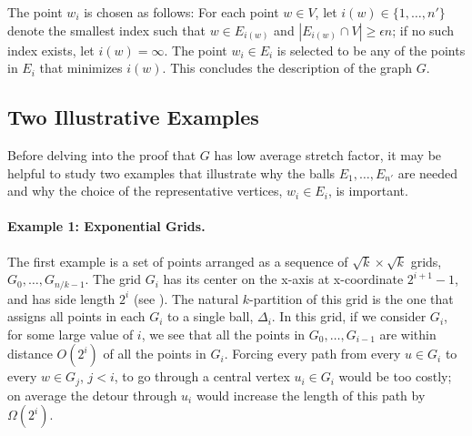 \documentclass{patmorin}
\begin{document}
The point $w_i$ is chosen as follows: For each point $w\in V$, let
$i(w)\in \{1,\ldots,n'\}$ denote the smallest index such that $w\in
E_{i(w)}$ and $|E_{i(w)}\cap V| \ge \epsilon n$; if no such index exists,
let $i(w)=\infty$.  The point $w_i\in E_i$ is selected to be any of the
points in $E_i$ that minimizes $i(w)$.  This concludes the description
of the graph $G$.


\subsection{Two Illustrative Examples}
Before delving into the proof that $G$ has low average stretch factor,
it may be helpful to study two examples that illustrate why the balls
$E_1,\ldots,E_{n'}$ are needed and why the choice of the representative
vertices, $w_i\in E_i$, is  important.

\paragraph{Example 1: Exponential Grids.}
The first example is a set of points arranged as a sequence of
$\sqrt{k}\times\sqrt{k}$ grids, $G_0,\ldots,G_{n/k-1}$.  The grid $G_i$
has its center on the x-axis at x-coordinate $2^{i+1}-1$, and has side
length $2^i$ (see ). The natural $k$-partition of this
grid is the one that assigns all points in each $G_i$ to a single ball,
$\Delta_i$.  In this grid, if we consider $G_i$, for some large value
of $i$, we see that all the points in $G_0,\ldots,G_{i-1}$ are within
distance $O(2^{i})$ of all the points in $G_i$.  Forcing every path from
every $u\in G_i$ to every $w\in G_{j}$, $j<i$, to go through a central
vertex $u_i\in G_i$ would be too costly; on average the detour through
$u_i$ would increase the length of this path by $\Omega(2^{i})$.

\begin{figure}
  \begin{minipage}{.47\textwidth}
  \end{minipage}
  \hspace{.06\textwidth}
  \begin{minipage}{.47\textwidth}
  \end{minipage}
\end{figure}
\end{document}
